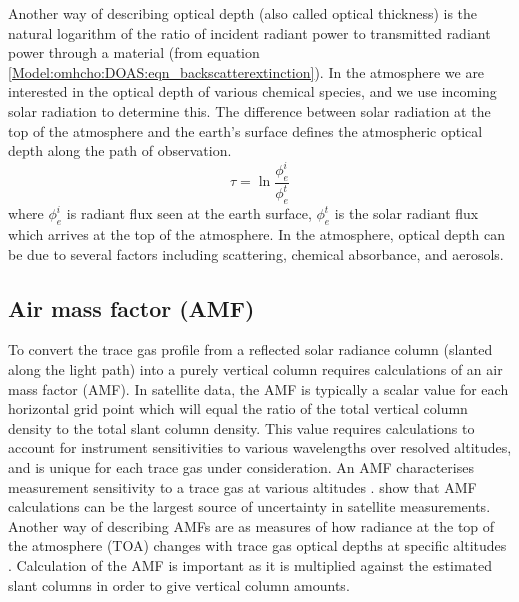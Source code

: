     Another way of describing optical depth (also called optical thickness) is the natural logarithm of the ratio of incident radiant power to transmitted radiant power through a material (from equation \ref{Model:omhcho:DOAS:eqn_backscatterextinction}).
    In the atmosphere we are interested in the optical depth of various chemical species, and we use incoming solar radiation to determine this.
    The difference between solar radiation at the top of the atmosphere and the earth's surface defines the atmospheric optical depth along the path of observation.
    \begin{equation*}
      \tau = \ln{\frac{\phi_e^i}{\phi_e^t}}
    \end{equation*}
    where $\phi_e^i$ is radiant flux seen at the earth surface, $\phi_e^t$ is the solar radiant flux which arrives at the top of the atmosphere.
    In the atmosphere, optical depth can be due to several factors including scattering, chemical absorbance, and aerosols.
  
  \subsection{Air mass factor (AMF)}
  \label{Model:omhcho:amf}
    To convert the trace gas profile from a reflected solar radiance column (slanted along the light path) into a purely vertical column requires calculations of an air mass factor (AMF).
    In satellite data, the AMF is typically a scalar value for each horizontal grid point which will equal the ratio of the total vertical column density to the total slant column density.
    This value requires calculations to account for instrument sensitivities to various wavelengths over resolved altitudes, and is unique for each trace gas under consideration.
    An AMF characterises measurement sensitivity to a trace gas at various altitudes \cite[e.g.,]{Palmer2001}.
    \textcite{Lorente2017} show that AMF calculations can be the largest source of uncertainty in satellite measurements.
    Another way of describing AMFs are as measures of how radiance at the top of the atmosphere (TOA) changes with trace gas optical depths at specific altitudes \parencite{Lorente2017}.
    Calculation of the AMF is important as it is multiplied against the estimated slant columns in order to give vertical column amounts.
    
